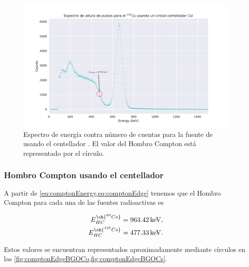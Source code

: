 \documentclass[12pt]{article}
\begin{document}
    \begin{figure}[!htb]
        \centering
        \includegraphics[scale=0.8, trim={1cm 0 1cm 0}, clip]{compton_edge_CsICs.pdf}
        \caption{Espectro de energía contra número de cuentas para la fuente de  usando el centellador . El valor del Hombro Compton está representado por el círculo.}
        \label{fig:comptonEdgeCsICs}
    \end{figure}

    \subsubsection*{Hombro Compton usando el centellador }

    A partir de \cref{eq:comptonEnergy,eq:comptonEdge} tenemos que el Hombro Compton para cada una de las fuentes radioactivas es

    \begin{align*}
        E_{HC}^{\ch{^{60} Co}} &= \qty{963.42}{\keV},\\
        E_{HC}^{\ch{^{137} Cs}} &= \qty{477.33}{\keV}.
    \end{align*}

    Estos valores se encuentran representados aproximadamente mediante círculos en las \cref{fig:comptonEdgeBGOCo,fig:comptonEdgeBGOCs}.
\end{document}
